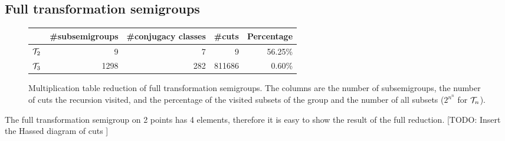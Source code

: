 \documentclass{article}
\theoremstyle{plain}
\theoremstyle{definition}
\newcommand{\cT}{{\cal T}}
\newcommand{\todo}[1]{ \small \textsf{[TODO:  #1 ]} \normalsize}
\begin{document}
\subsection{Full transformation semigroups}

\begin{figure}
\begin{center}
\begin{tabular}{|l|r|r|r|r|}\hline
 & \#subsemigroups & \#conjugacy classes &\#cuts & Percentage\\
\hline
$\cT_2$ & 9 & 7 & 9 & 56.25\% \\
\hline
$\cT_3$ & 1298 & 282 &  811686 & 0.60\% \\
\hline
\end{tabular}
\end{center}
\caption{Multiplication table reduction of full transformation semigroups. The columns are the number of subsemigroups, the number of cuts the recursion visited, and the percentage of the visited subsets of the group and the number of all subsets ($2^{n^n}$ for $\cT_n$).}
\end{figure}

The full transformation semigroup on 2 points has 4 elements, therefore it is easy to show the result of the full reduction. \todo{Insert the Hassed diagram of cuts}
\end{document}
